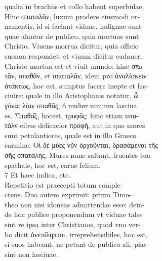 \documentclass{article}
\begin{document}
\begin{pages}
                qualia in brachiis et collo habent superbulae, \\
                Hinc σπαταλᾶν, luxum prodere eiusmodi or- \\
                namentis, id si faciant viduae, indignae sunt \\
                quae alantur de publico, quia mortuae sunt \\
                Christo. Viuens morrua dicitur, quia officio \\
                suonon respondet: et viuum dicitur cadauer. \\
                Christo mortua est et viuit mundo: hinc σπa- \\
                τᾶν, σπαθᾶν, et σπαταλᾶν, idem pro ἀναλίσκειν \\
                ἀτάκτως, hoc est, sumptus facere inepte et las- \\
                ciuire: quale in illo Aristophanis notatur. ὦ \\
                γύναι λίαν σπαθᾶς, ô mulier nimium lasciua \\
                es. Σπαθα̃͂ς, hocest, τρυφᾶς: hinc etiam σπα- \\
                τάλν cibus delicacior προφὴ, aut in quo mores \\
                sunt petulantiores, quale est in illo Graeco \\
                carmine, Οἱ δὲ μύες νῦν ὀρχοῦνται, δρασάμενοι τῆς \\
                σῆς σπατάλης, Mures nunc saltant, fruentes tua \\
                spathale, hoc est, carne felium. \\
                7 Et haec indica, etc. \\
                Repetitio est praecepti totum comple- \\
                ctens. Duo autem exprimit: primo Timo- \\
                theo non nisi idoneas admittendas esse: dein- \\
                de hoc publice proponendum vt viduae tales \\
                sint re ipsa inter Christianos, quod vno ver- \\
                bo dicit ἀνεπίληπτοι, irreprehensibiles, hoc est, \\
                si suos habeant, ne petant de publico ali, piae \\
                sint non lasciuae. \\

\end{pages}
\end{document}
